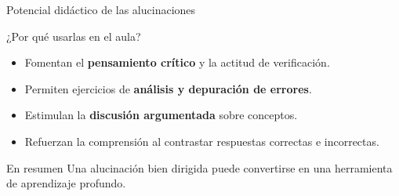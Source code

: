 \begin{frame}[t]{Potencial didáctico de las alucinaciones}
\begin{block}{¿Por qué usarlas en el aula?}
\begin{itemize}
    \item Fomentan el \textbf{pensamiento crítico} y la actitud de verificación.
    \item Permiten ejercicios de \textbf{análisis y depuración de errores}.
    \item Estimulan la \textbf{discusión argumentada} sobre conceptos.
    \item Refuerzan la comprensión al contrastar respuestas correctas e incorrectas.
\end{itemize}
\end{block}

\vspace{0.3cm}
\pause
\begin{block}{En resumen}
Una alucinación bien dirigida puede convertirse en una herramienta de aprendizaje profundo.
\end{block}
\end{frame}

